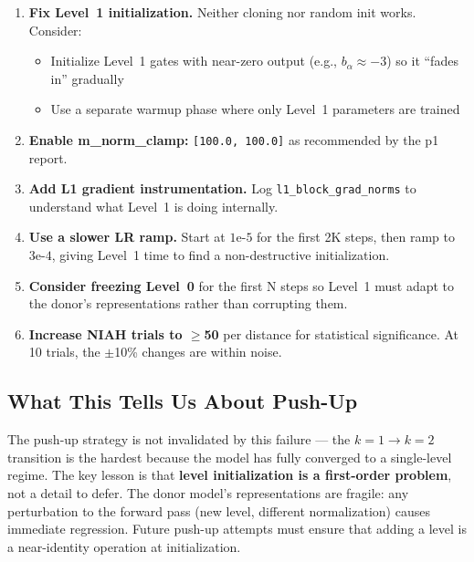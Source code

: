 \documentclass[11pt,a4paper]{article}
\begin{document}
\begin{enumerate}[topsep=4pt, itemsep=2pt]
    \item \textbf{Fix Level~1 initialization.} Neither cloning nor random init works. Consider:
    \begin{itemize}
        \item Initialize Level~1 gates with near-zero output (e.g., $b_\alpha \approx -3$) so it
              ``fades in'' gradually
        \item Use a separate warmup phase where only Level~1 parameters are trained
    \end{itemize}

    \item \textbf{Enable m\_norm\_clamp:} \texttt{[100.0, 100.0]} as recommended by the p1 report.

    \item \textbf{Add L1 gradient instrumentation.} Log \texttt{l1\_block\_grad\_norms} to
    understand what Level~1 is doing internally.

    \item \textbf{Use a slower LR ramp.} Start at $1\text{e-}5$ for the first 2K steps, then
    ramp to $3\text{e-}4$, giving Level~1 time to find a non-destructive initialization.

    \item \textbf{Consider freezing Level~0} for the first N steps so Level~1 must adapt to the
    donor's representations rather than corrupting them.

    \item \textbf{Increase NIAH trials to $\geq$50} per distance for statistical significance.
    At 10 trials, the $\pm$10\% changes are within noise.
\end{enumerate}

\subsection{What This Tells Us About Push-Up}

The push-up strategy is not invalidated by this failure --- the $k{=}1 \to k{=}2$ transition is
the hardest because the model has fully converged to a single-level regime. The key lesson is
that \textbf{level initialization is a first-order problem}, not a detail to defer. The donor
model's representations are fragile: any perturbation to the forward pass (new level, different
normalization) causes immediate regression. Future push-up attempts must ensure that adding a
level is a near-identity operation at initialization.
\end{document}
